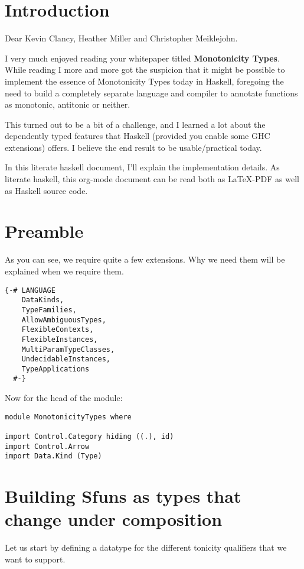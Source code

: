 \documentclass[11pt]{article}
\author{Wiebe-Marten Wijnja}
\date{\today}
\title{}
\begin{document}
\tableofcontents


\section{Introduction}
\label{sec:org07601ad}

Dear Kevin Clancy, Heather Miller and Christopher Meiklejohn.

I very much enjoyed reading your whitepaper titled \textbf{Monotonicity Types}.
While reading I more and more got the suspicion that it might be possible to implement the essence of Monotonicity Types today in Haskell,
foregoing the need to build a completely separate language and compiler to annotate functions as monotonic, antitonic or neither.

This turned out to be a bit of a challenge, and I learned a lot about the dependently typed features that Haskell (provided you enable some GHC extensions) offers.
I believe the end result to be usable/practical today.

In this literate haskell document, I'll explain the implementation details.
As literate haskell, this org-mode document can be read both as \LaTeX{}-PDF as well as Haskell source code.


\section{Preamble}
\label{sec:org183e656}
As you can see, we require quite a few extensions. Why we need them will be explained when we require them.
\begin{verbatim}
{-# LANGUAGE
    DataKinds,
    TypeFamilies,
    AllowAmbiguousTypes,
    FlexibleContexts,
    FlexibleInstances,
    MultiParamTypeClasses,
    UndecidableInstances,
    TypeApplications
  #-}

\end{verbatim}

Now for the head of the module:

\begin{verbatim}
module MonotonicityTypes where

import Control.Category hiding ((.), id)
import Control.Arrow
import Data.Kind (Type)
\end{verbatim}

\section{Building Sfuns as types that change under composition}
\label{sec:org7591fd8}
Let us start by defining a datatype for the different tonicity qualifiers that we want to support.
\end{document}
